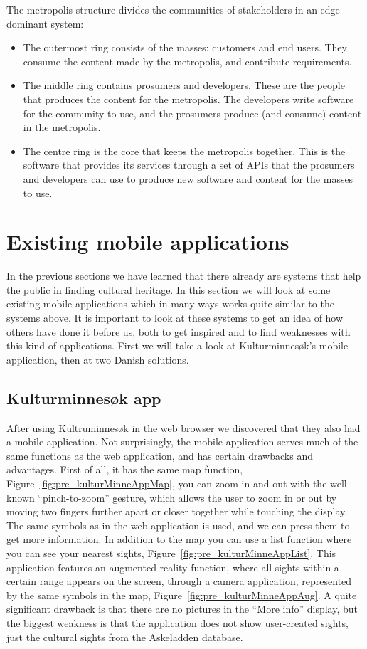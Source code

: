 \documentclass[11pt]{book}
\begin{document}
The metropolis structure divides the communities of stakeholders in an edge dominant system:

\begin{itemize}
  \item The outermost ring consists of the masses: customers and end users. They consume the content made by the metropolis, and contribute requirements.
  \item The middle ring contains prosumers and developers. These are the people that produces the content for the metropolis. The developers write software for the community to use, and the prosumers produce (and consume) content in the metropolis.
  \item The centre ring is the core that keeps the metropolis together. This is the software that provides its services through a set of APIs that the prosumers and developers can use to produce new software and content for the masses to use.
\end{itemize}

\section{Existing mobile applications}\label{sec:prestudy_existing_apps}
In the previous sections we have learned that there already are systems that help the public in finding cultural heritage. In this section we will look at some existing mobile applications which in many ways works quite similar to the systems above. It is important to look at these systems to get an idea of how others have done it before us, both to get inspired and to find weaknesses with this kind of applications. First we will take a look at Kulturminnesøk's mobile application, then at two Danish solutions.

\subsection{Kulturminnesøk app}
After using Kultruminnesøk in the web browser we discovered that they also had a mobile application. Not surprisingly, the mobile application serves much of the same functions as the web application, and has certain drawbacks and  advantages. First of all, it has the same map function, Figure~\ref{fig:pre_kulturMinneAppMap}, you can zoom in and out with the well known ``pinch-to-zoom'' gesture, which allows the user to zoom in or out by moving two fingers further apart or closer together while touching the display. The same symbols as in the web application is used, and we can press them to get more information. In addition to the map you can use a list function where you can see your nearest sights, Figure~\ref{fig:pre_kulturMinneAppList}. This application features an augmented reality function, where all sights within a certain range appears on the screen, through a camera application, represented by the same symbols in the map, Figure~\ref{fig:pre_kulturMinneAppAug}.  A quite significant drawback is that there are no pictures in the ``More info'' display, but the biggest weakness is that the application does not show user-created sights, just the cultural sights from the Askeladden database. %
\end{document}
